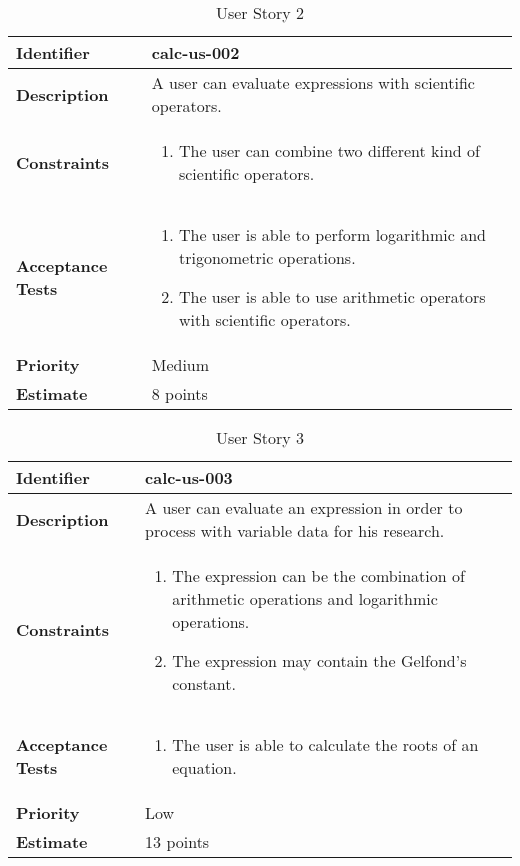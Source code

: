 \documentclass{article}
\begin{document}
\begin{table}[h]
\centering
\begin{tabular}{|p{2.2cm}|p{12cm}|}
\hline
\textbf{Identifier} & {calc-us-002} \\
\hline
\textbf{Description} & {A user can evaluate expressions with scientific operators.}\\
\hline
\textbf{Constraints} & 
\begin{enumerate}
    \item The user can combine two different kind of scientific operators.
\end{enumerate}\\
\hline
\textbf{Acceptance Tests} & 
\begin{enumerate}
    \item The user is able to perform logarithmic and trigonometric operations.
    \item The user is able to use arithmetic operators with scientific operators.
\end{enumerate}\\
\hline
\textbf{Priority} & {Medium}\\
\hline
\textbf{Estimate} & {8 points}\\
\hline
\end{tabular}
\caption{User Story 2}
\end{table}

\begin{table}[h]
\centering
\begin{tabular}{|p{2.2cm}|p{12cm}|}
\hline
\textbf{Identifier} & {calc-us-003} \\
\hline
\textbf{Description} & {A user can evaluate an expression in order to process with variable data for his research.}\\
\hline
\textbf{Constraints} & 
\begin{enumerate}
    \item The expression can be the combination of arithmetic operations and logarithmic operations.
    \item The expression may contain the Gelfond's constant.
\end{enumerate}\\
\hline
\textbf{Acceptance Tests} & 
\begin{enumerate}
    \item The user is able to calculate the roots of an equation.
\end{enumerate}\\
\hline
\textbf{Priority} & {Low}\\
\hline
\textbf{Estimate} & {13 points}\\
\hline
\end{tabular}
\caption{User Story 3}
\end{table}
\end{document}

